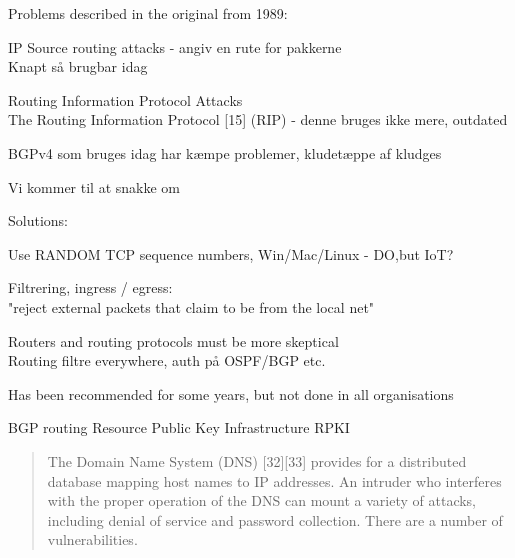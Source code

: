 \documentclass[Screen16to9,17pt]{foils}
\begin{document}

\begin{list1}
\item Problems described in the original from 1989:
\begin{list2}
\item IP Source routing attacks - angiv en rute for pakkerne\\
Knapt så brugbar idag
\item Routing Information Protocol Attacks\\
The Routing Information Protocol [15] (RIP) - denne bruges ikke mere, outdated
\item BGPv4 som bruges idag har kæmpe problemer, kludetæppe af kludges
\end{list2}
\item Vi kommer til at snakke om 
\end{list1}


\begin{list1}
\item Solutions:
\begin{list2}
\item Use RANDOM TCP sequence numbers, Win/Mac/Linux - DO,but IoT?
\item Filtrering, ingress / egress:\\
"reject external packets that claim to be from the local net"
\item Routers and routing protocols must be more skeptical\\
Routing filtre everywhere, auth på OSPF/BGP etc.
\end{list2}
\item Has been recommended for some years, but not done in all organisations
\item BGP routing Resource Public Key Infrastructure RPKI
\end{list1}


\begin{quote}
The Domain Name System (DNS) [32][33] provides for a distributed database mapping host names to IP
addresses. An intruder who interferes with the proper operation of the DNS can mount a variety of
attacks, including denial of service and password collection. There are a number of vulnerabilities.
\end{quote}
\end{document}
